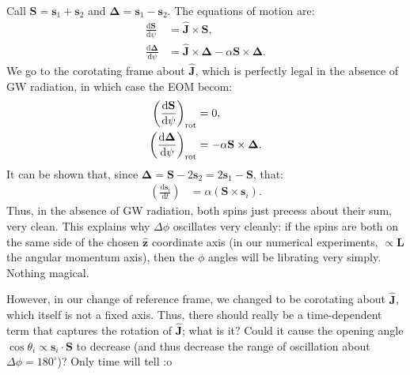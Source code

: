 \documentclass[11pt,
        usenames, %
        dvipsnames %
    ]{article}
\newcommand*{\rd}[2]{\frac{\mathrm{d}#1}{\mathrm{d}#2}}
\newcommand*{\bm}[1]{\boldsymbol{\mathbf{#1}}}
\newcommand*{\uv}[1]{\hat{\bm{#1}}}
\newcommand*{\p}[1]{\left(#1\right)}
\begin{document}
Call $\bm{S} = \bm{s}_1 + \bm{s}_2$ and $\bm{\Delta} = \bm{s}_1 - \bm{s}_2$. The
equations of motion are:
\begin{align}
    \rd{\bm{S}}{\psi} &= \uv{J} \times \bm{S},\\
    \rd{\bm{\Delta}}{\psi} &= \uv{J} \times \bm{\Delta}
        - \alpha \bm{S} \times \bm{\Delta}.
\end{align}
We go to the corotating frame about $\uv{J}$, which is perfectly legal in the
absence of GW radiation, in which case the EOM becom:
\begin{align}
    \p{\rd{\bm{S}}{\psi}}_{\rm rot} &= 0,\\
    \p{\rd{\bm{\Delta}}{\psi}}_{\rm rot} &= - \alpha \bm{S} \times \bm{\Delta}.
\end{align}
It can be shown that, since $\bm{\Delta} = \bm{S} - 2\bm{s}_2 = 2\bm{s}_1 -
\bm{S}$, that:
\begin{align}
    \p{\rd{\bm{s}_i}{t}} &= \alpha\p{\bm{S} \times \bm{s}_i}.
\end{align}
Thus, in the absence of GW radiation, both spins just precess about their sum,
very clean. This explains why $\Delta \phi$ oscillates very cleanly: if the
spins are both on the same side of the chosen $\uv{z}$ coordinate axis (in our
numerical experiments, $\propto \bm{L}$ the angular momentum axis), then the
$\phi$ angles will be librating very simply. Nothing magical.

However, in our change of reference frame, we changed to be corotating about
$\uv{J}$, which itself is not a fixed axis. Thus, there should really be a
time-dependent term that captures the rotation of $\uv{J}$; what is it? Could it
cause the opening angle $\cos \theta_{i} \propto \bm{s}_i \cdot \bm{S}$ to
decrease (and thus decrease the range of oscillation about $\Delta \phi =
180^\circ$)? Only time will tell :o
\end{document}
